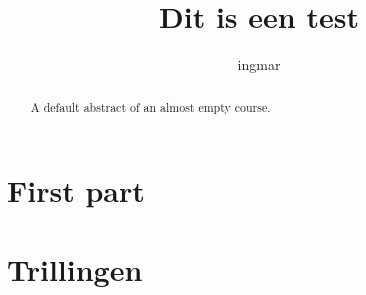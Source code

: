 \documentclass{xourse}
\title{Dit is een test}
\author{ingmar}
\begin{document}
\begin{abstract}
    A default abstract of an almost empty course.
\end{abstract}
\maketitle

\part{First part}


\part{Trillingen}
\end{document}
